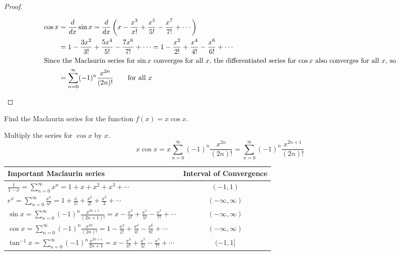 \begin{proof}
\begin{enumerate}
\begin{align*}
        \cos x &= \frac{d}{dx} \sin x = \frac{d}{dx} \left( x - \frac{x^3}{x!} + \frac{x^5}{5!} - \frac{x^7}{7!} + \cdots \right) \\
        &= 1- \frac{3x^2}{3!} + \frac{5x^4}{5!} - \frac{7x^6}{7!} + \cdots = 1- \frac{x^2}{2!} + \frac{x^4}{4!} - \frac{x^6}{6!} + \cdots \\
        \intertext{Since the Maclaurin series for $\sin x$ converges for all $x$, the differentiated series for $\cos x$ also converges for all $x$, so}
        &= \sum_{n=0}^{\infty} (-1)^n \frac{x^{2n}}{(2n)!} \qquad \text{for all } x
      \end{align*}
    \end{enumerate}
  \end{proof}
  \begin{example}
    Find the Maclaurin series for the function $f(x)=x\cos x$.
  \end{example}
  \begin{solution}
    Multiply the series for $\cos x$ by $x$.
    $$ x\cos x = x \sum_{n=0}^{\infty} (-1)^n \frac{x^{2n}}{(2n)!} = \sum_{n=0}^{\infty} (-1)^n \frac{x^{2n+1}}{(2n)!} $$
  \end{solution}
  \begin{minipage}{\textwidth}
    \begin{center}
      \bgroup
      \def\arraystretch{3}
      \begin{tabular}{ |l c| }
        \hline
        Important Maclaurin series & Interval of Convergence \\
        \hline
        $\displaystyle \frac{1}{1-x} = \sum_{n=0}^{\infty} x^n = 1 + x + x^2 + x^3 + \cdots$ & $(-1,1)$ \\
        $\displaystyle e^x = \sum_{n=0}^{\infty} \frac{x^n}{n!} = 1 + \frac{x}{1!} + \frac{x^2}{2!} + \frac{x^3}{3} + \cdots$ & $(-\infty,\infty)$ \\
        $\displaystyle \sin x = \sum_{n=0}^{\infty} (-1)^n \frac{x^{2n+1}}{(2n+1)!} = x - \frac{x^3}{x!} + \frac{x^5}{5!} - \frac{x^7}{7!} + \cdots$ & $(-\infty,\infty)$ \\
        $\displaystyle \cos x = \sum_{n=0}^{\infty} (-1)^n \frac{x^{2n}}{(2n)!} = 1- \frac{x^2}{2!} + \frac{x^4}{4!} - \frac{x^6}{6!} + \cdots $ & $(-\infty,\infty)$ \\
        $\displaystyle \tan^{-1}x = \sum_{n=0}^{\infty} (-1)^n \frac{x^{2n+1}}{2n+1} = x - \frac{x^3}{x!} + \frac{x^5}{5!} - \frac{x^7}{7!} + \cdots$ & $(-1,1]$ \\
        \hline
      \end{tabular}
      \egroup
    \end{center}
  \end{minipage}

